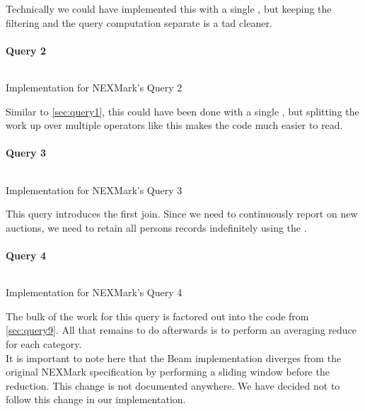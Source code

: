 Technically we could have implemented this with a single , but keeping the filtering and the query computation separate is a tad cleaner.

\paragraph{Query 2}
\begin{listing}[H]
  \inputminted[firstline=459,lastline=462]{rust}{benchmarks/src/nexmark.rs}
  \caption{Implementation for NEXMark's Query 2}
  \label{lst:nexmark-query2}
\end{listing}

Similar to \autoref{sec:query1}, this could have been done with a single , but splitting the work up over multiple operators like this makes the code much easier to read.

\paragraph{Query 3}
\begin{listing}[H]
  \inputminted[firstline=493,lastline=502]{rust}{benchmarks/src/nexmark.rs}
  \caption{Implementation for NEXMark's Query 3}
  \label{lst:nexmark-query3}
\end{listing}

This query introduces the first join. Since we need to continuously report on new auctions, we need to retain all persons records indefinitely using the .

\paragraph{Query 4}\label{sec:query4}
\begin{listing}[H]
  \inputminted[firstline=533,lastline=534]{rust}{benchmarks/src/nexmark.rs}
  \caption{Implementation for NEXMark's Query 4}
  \label{lst:nexmark-query4}
\end{listing}

The bulk of the work for this query is factored out into the code from \autoref{sec:query9}. All that remains to do afterwards is to perform an averaging reduce for each category. \\

It is important to note here that the Beam implementation diverges from the original NEXMark specification by performing a sliding window before the reduction. This change is not documented anywhere. We have decided not to follow this change in our implementation.

